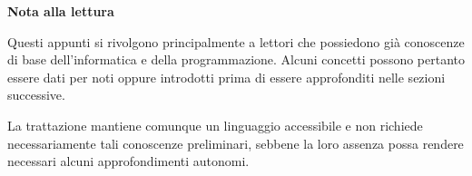 \documentclass[italian]{unipd-notes}
\begin{document}
\makecoursecover

\hypersetup{pageanchor=false}
\thispagestyle{empty}
\vspace*{\fill}

\begin{center}
\begin{minipage}{0.72\textwidth}
\centering

{\large\bfseries Nota alla lettura\par}

\vspace{1.5em}

Questi appunti si rivolgono principalmente a lettori
che possiedono già conoscenze di base dell'informatica
e della programmazione. Alcuni concetti possono pertanto
essere dati per noti oppure introdotti prima di essere
approfonditi nelle sezioni successive.

\par\vspace{1em}

La trattazione mantiene comunque un linguaggio accessibile
e non richiede necessariamente tali conoscenze preliminari,
sebbene la loro assenza possa rendere necessari alcuni
approfondimenti autonomi.

\end{minipage}
\end{center}

\vspace*{\fill}
\clearpage
\hypersetup{pageanchor=true}

\makecoursetableofcontents
\makecoursemainmatter


















\end{document}
